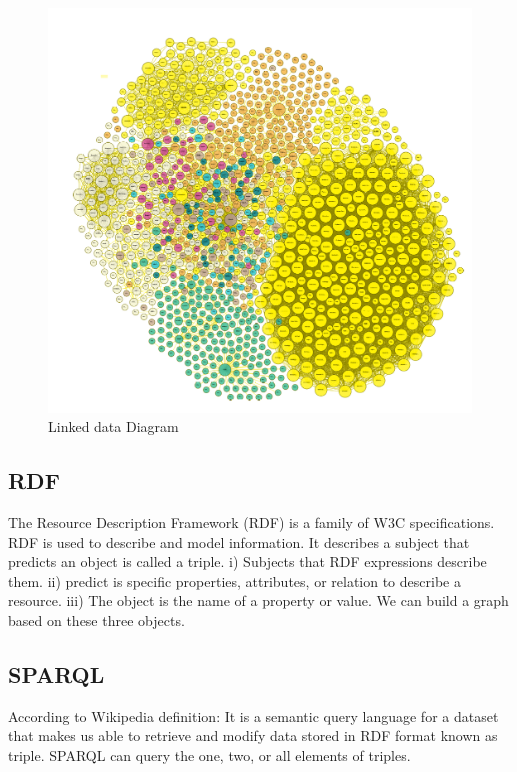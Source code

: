 \begin{center}
	\begin{figure}[htb!]
		
		\begin{minipage}{0.55\linewidth}
			\centering
			\includegraphics[width=1.55\textwidth]{images/chap02_LinkData.png}
		\end{minipage}
		\caption[Linked data diagram]{Linked data Diagram\cite{Hector}}
		
		
	\end{figure}
	
\end{center}
\subsection{RDF}
The Resource Description Framework (RDF) is a family of W3C specifications. RDF is used to describe and model information. It describes a subject that predicts an object is called a triple.
i) Subjects that RDF expressions describe them.
ii) predict is specific properties, attributes, or relation to describe a resource.
iii) The object is the name of a property or value.
We can build a graph based on these three objects\cite{Hector}.

\subsection{SPARQL}
According to Wikipedia definition: It is a semantic query language for a dataset that makes us able to retrieve and modify data stored in RDF format known as triple. SPARQL can query the one, two, or all elements of triples.    

